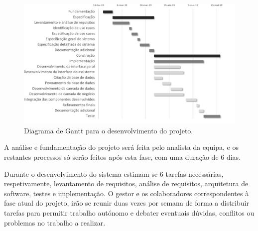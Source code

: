 
\begin{figure}[ht]
  \centering
  \includegraphics[width=\textwidth]{figures/03/planeamento-gantt.pdf}
  \caption{Diagrama de Gantt para o desenvolvimento do projeto.}
  \label{fig:planeamento:gantt}
\end{figure}

A análise e fundamentação do projeto será feita pelo analista da equipa, e os restantes processos só serão feitos após esta fase, com uma duração de 6 dias.

Durante o desenvolvimento do sistema estimam-se 6 tarefas necessárias, respetivamente, levantamento de requisitos, análise de requisitos, arquitetura de software, testes e implementação.
O gestor e os colaboradores correspondentes à fase atual do projeto, irão se reunir duas vezes por semana de forma a distribuir tarefas para permitir trabalho autónomo e debater eventuais dúvidas, conflitos ou problemas no trabalho a realizar.

